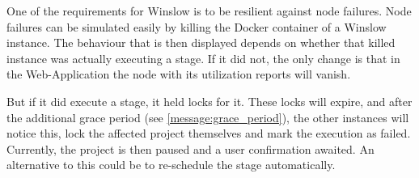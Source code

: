 One of the requirements for Winslow is to be resilient against node failures.
Node failures can be simulated easily by killing the Docker container of a Winslow instance.
The behaviour that is then displayed depends on whether that killed instance was actually executing a stage.
If it did not, the only change is that in the Web-Application the node with its utilization reports will vanish.

But if it did execute a stage, it held locks for it.
These locks will expire, and after the additional grace period (see \autoref{message:grace_period}), the other instances will notice this, lock the affected project themselves and mark the execution as failed.
Currently, the project is then paused and a user confirmation awaited.
An alternative to this could be to re-schedule the stage automatically.
